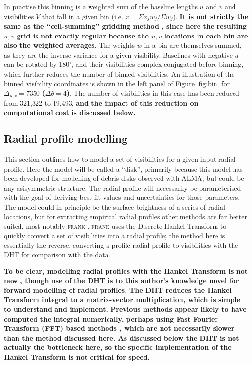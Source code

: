 \documentclass[fleqn,usenatbib]{mnras}
\begin{document}
In practise this binning is a weighted sum of the baseline lengths $u$ and $v$ and visibilities $V$ that fall in a given bin (i.e. $\bar{x} = \Sigma x_j w_j / \Sigma w_j$). \textbf{It is not strictly the same as the ``cell-summing'' gridding method \citep[e.g.][]{1974AJ.....79...11T}, since here the resulting $u,v$ grid is not exactly regular because the $u,v$ locations in each bin are also the weighted averages}. The weights $w$ in a bin are themselves summed, as they are the inverse variance for a given visibility. Baselines with negative $u$ can be rotated by 180$^\circ$, and their visibilities complex conjugated before binning, which further reduces the number of binned visibilities. An illustration of the binned visibility coordinates is shown in the left panel of Figure \ref{fig:bin} for $\Delta_{u,v}=7350$ \textbf{($\Delta \theta = 4$\arcsec)}. The number of visibilities in this case has been reduced from 321,322 to 19,493, \textbf{and the impact of this reduction on computational cost is discussed below.}

\subsection{Radial profile modelling}

This section outlines how to model a set of visibilities for a given input radial profile. Here the model will be called a ``disk'', primarily because this model has been developed for modelling of debris disks observed with ALMA, but could be any asisymmetric structure. The radial profile will necessarily be parameterised with the goal of deriving best-fit values and uncertainties for those parameters. The model could in principle be the surface brightness of a series of radial locations, but for extracting empirical radial profiles other methods are far better suited, most notably \textsc{frank} \citep{2020MNRAS.tmp.1491J}. \textsc{frank} uses the Discrete Hankel Transform to quickly convert a set of visibilities into a radial profile; the method here is essentially the reverse, converting a profile radial profile to visibilities with the DHT for comparison with the data.

\textbf{To be clear, modelling radial profiles with the Hankel Transform is not new \citep[e.g.][]{2014A&A...563A.136M,2016ApJ...818L..16Z,2018ApJ...869L..48G}, though use of the DHT is to this author's knowledge novel for forward modelling of radial profiles. The DHT reduces the Hankel Transform integral to a matrix-vector multiplication, which is simple to understand and implement. Previous methods appear likely to have computed the integral numerically, perhaps using Fast Fourier Transform (FFT) based methods \citep[e.g.][]{2000MNRAS.312..257H}, which are not necessarily slower than the method discussed here. As discussed below the DHT is not actually the bottleneck here, so the specific implementation of the Hankel Transform is not critical for speed.}
\end{document}
